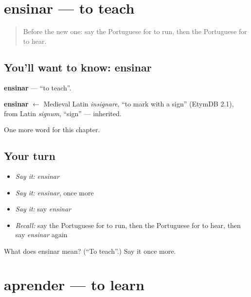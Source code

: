 \section[ensinar]{ensinar — to teach}

\label{lesson:PT-C42-ensinar}



\begin{quote}
Before the new one: say the Portuguese for to run, then the Portuguese for to hear.
\end{quote}

\subsection*{You'll want to know: ensinar}
\textbf{ensinar} — \textquotedblleft{}to teach\textquotedblright{}.

\begin{cousinweb}
\textbf{ensinar} $\leftarrow$ Medieval Latin \emph{insignare}, \textquotedblleft{}to mark with a sign\textquotedblright{} (EtymDB 2.1), from Latin \emph{signum}, \textquotedblleft{}sign\textquotedblright{} — inherited.
\end{cousinweb}

\begin{grammarlens}[title={What you've built}]
One more word for this chapter.
\end{grammarlens}

\subsection*{Your turn}
\begin{itemize}
\raggedright
  \item \emph{Say it:} \emph{ensinar}
  \item \emph{Say it:} \emph{ensinar}, once more
  \item \emph{Say it:} say \emph{ensinar}
  \item \emph{Recall:} say the Portuguese for to run, then the Portuguese for to hear, then say \emph{ensinar} again
\end{itemize}

\begin{tcolorbox}[breakable,colback=teal!4,colframe=teal!35!black,title={Before you move on}]
What does ensinar mean? (\textquotedblleft{}To teach\textquotedblright{}.) Say it once more.
\end{tcolorbox}
\section[aprender]{aprender — to learn}

